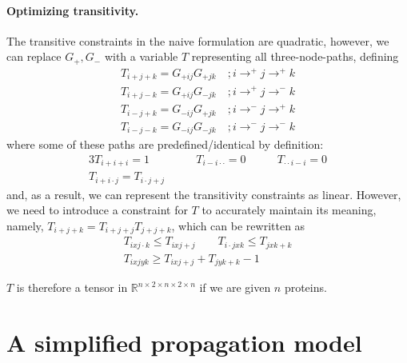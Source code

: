 \documentclass{article}
\begin{document}
\paragraph{Optimizing transitivity.}
The transitive constraints in the na\:ive formulation are quadratic, however, we can replace $G_+, G_-$ with a variable $T$ representing all three-node-paths, defining
\begin{align}
 T_{i+j+k} = G_{+ij} G_{+jk} \quad; i \rightarrow^+ j \rightarrow^+ k \\
 T_{i+j-k} = G_{+ij} G_{-jk} \quad; i \rightarrow^+ j \rightarrow^- k \\
 T_{i-j+k} = G_{-ij} G_{+jk} \quad; i \rightarrow^- j \rightarrow^+ k \\
 T_{i-j-k} = G_{-ij} G_{-jk} \quad; i \rightarrow^- j \rightarrow^- k
\end{align}
where some of these paths are predefined/identical by definition:
\begin{alignat}{3}
 T_{i+i+i} = 1 \qquad & T_{i-i \cdot \cdot} = 0 \qquad & T_{ \cdot \cdot i - i } = 0 \\
 T_{i+i \cdot j} = T_{i \cdot j+j} \qquad &
\end{alignat}
and, as a result, we can represent the transitivity constraints as linear.
However, we need to introduce a constraint for $T$ to accurately maintain its meaning, namely, $T_{i+j+k} = T_{i+j+j} T_{j+j+k}$, which can be rewritten as
\begin{gather}
  T_{i x j \cdot k} \leq T_{i x j+j} \qquad T_{i \cdot j x k} \leq T_{j x k + k} \\
  T_{i x j y k} \geq T_{i x j + j} + T_{j y k + k} - 1
\end{gather}

$T$ is therefore a tensor in $\mathbb R^{n \times 2 \times n \times 2 \times n}$ if we are given $n$ proteins.

\section{A simplified propagation model}
\end{document}
